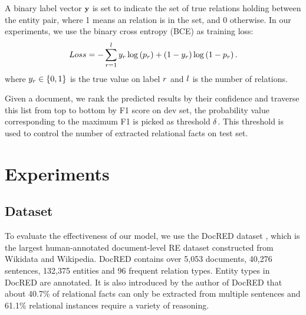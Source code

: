 \documentclass[runningheads]{llncs}
\begin{document}
A binary label vector $\small \textbf{y}$ is set to indicate the set of true relations holding between the entity pair, where 1 means an relation is in the set, and 0 otherwise. 
In our experiments, we use the binary cross entropy (BCE) as training loss:
\begin{equation}
\small
Loss = -\sum_{r=1}^{l} y_{r} \log \left(p_{r}\right)+\left(1-y_{r}\right) \log \left(1-p_{r}\right).
\end{equation}
where $\small y_{r} \in\{0,1\}$ is the true value on label $\small r$ and $\small l$ is the number of relations.

Given a document, we rank the predicted results by their confidence and traverse this list from top to bottom by F1 score on dev set, the probability value corresponding to the maximum F1 is picked as threshold $\small \delta$.
This threshold is used to control the number of extracted relational facts on test set.

\section{Experiments}
\subsection{Dataset}

To evaluate the effectiveness of our model, we use the DocRED dataset \cite{Yao2019DocREDAL}, which is the largest human-annotated document-level RE dataset constructed from Wikidata and Wikipedia.
DocRED contains over 5,053 documents, 40,276 sentences, 132,375 entities and 96 frequent relation types.
Entity types in DocRED are annotated.
It is also introduced by the author of DocRED that about 40.7\% of relational facts can only be extracted from multiple sentences and 61.1\% relational instances require a variety of reasoning.
\end{document}
